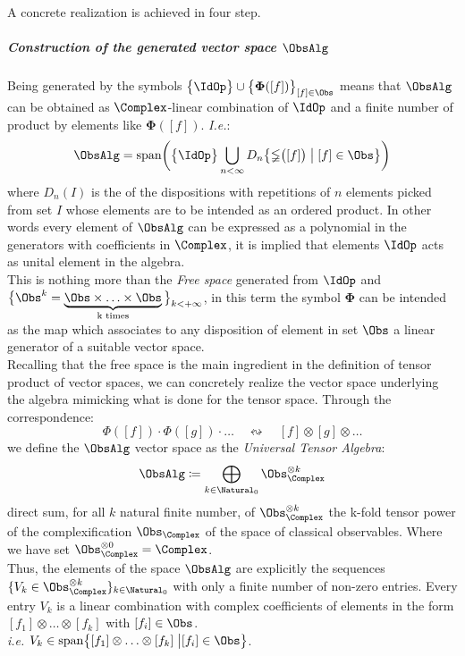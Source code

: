 \documentclass[Main]{subfiles}
\begin{document}
		A concrete realization is achieved in four step.
			\subparagraph{Construction of the generated vector space $\ObsAlg$}
   				Being generated by the symbols $\big\{\IdOp\big\}\cup\big\{\mathbf{\Phi}([f])\big\}_{[f]\in \Obs}$ means that $\ObsAlg$ can be obtained as $\Complex$-linear combination of $\IdOp$ and a finite number of product by elements like $\mathbf{\Phi}([f])$.
   				\textit{I.e.}:
   				\begin{displaymath}
   					\ObsAlg = \textrm{span} \biggr( \big\{\IdOp\big\}\bigcup_{n<\infty}D_n
   					\big\{\mathbb{\Phi}\big( [f]\big) \; \big\vert \;  [f] \in \Obs \big\}
   					\biggr)
   				\end{displaymath}
   				where $D_n (I)$ is the of the dispositions with repetitions of $n$ elements picked from set $I$ whose elements are to be intended as an ordered product. In other words every element of $\ObsAlg$ can be expressed as a polynomial in the generators with coefficients in $\Complex$, it is implied that elements $\IdOp$ acts as unital element in the algebra.
   				\\
				This is nothing more than the \emph{Free space} generated from $\IdOp$ and $\big\{\Obs^k = 
   				\underbrace{\Obs\times \ldots \times \Obs}_{\textrm{k times}} \big\}_{k< + \infty}$, in this term the symbol $\mathbf{\Phi}$ can be intended as the map which associates to any disposition of element in set $\Obs$ a linear generator of a suitable vector space.
   				\\
   				Recalling that the free space is the main ingredient in the definition of tensor product of vector spaces, we can concretely realize the vector space underlying the algebra mimicking what is done for the tensor space.
   				Through the correspondence:
   				\begin{displaymath}
   					\mathbb{\Phi}([f]) \cdot \mathbb{\Phi}([g]) \cdot \ldots \quad \leftrightsquigarrow \quad [f] \otimes [g] \otimes \ldots
   				\end{displaymath}
   				we define the $\ObsAlg$ vector space as the \emph{Universal Tensor Algebra}:
   				\begin{displaymath}
   					\ObsAlg \coloneqq \bigoplus_{k \in \Natural_0} \Obs_\Complex^{\otimes k}
   				\end{displaymath}
   				direct sum, for all $k$ natural finite number, of $\Obs_\Complex^{\otimes k}$ the k-fold tensor power of the complexification $\Obs_\Complex$ of the space of classical observables.
   				Where we have set $\Obs_\Complex^{\otimes 0} = \Complex$.
				\\
				Thus, the elements of the space $\ObsAlg$ are explicitly the sequences $\{ V_k \in \Obs_\Complex^{\otimes k} \}_{k\in \Natural_0}$ with only a finite number of non-zero entries.
				Every entry $V_k$ is a linear combination with complex coefficients  of elements in the form $[f_1]\otimes\ldots \otimes [f_k]$ with $[f_i] \in \Obs$.\\
				\textit{i.e.} $V_k \in \textrm{span}\big\{[f_1]\otimes\ldots \otimes [f_k] \; \big \vert [f_i] \in \Obs \big\}$.
			
\end{document}
